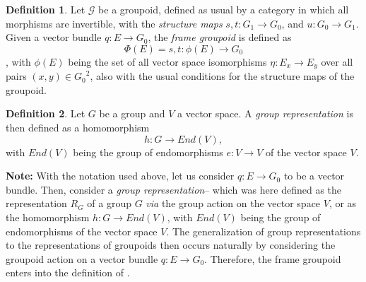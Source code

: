 \documentclass[12pt]{article}
\theoremstyle{plain}
\theoremstyle{definition}
\newtheorem{definition}{Definition}[section]
\numberwithin{equation}{section}
\newcommand{\grp}{\mathcal G}
\newcommand{\<}{{\langle}}
\begin{document}
\begin{definition}
Let $\grp$ be a groupoid, defined as usual by a category in which all morphisms are invertible, with the \emph{structure maps} $s,t: G_1 \longrightarrow  G_0$, and $u: G_0 \longrightarrow G_1$. Given a vector bundle $q : E \longrightarrow  G_0$, the \emph{frame groupoid} is defined as $$\Phi(E)=s,t: \phi(E) \longrightarrow  G_0$$,  with $\phi(E)$ being the set of all vector space isomorphisms $\eta: E_x \longrightarrow  E_y$ over all pairs $(x,y) \in {G_0}^2$, also with the usual conditions for the structure maps of the groupoid. 
\end{definition}



\begin{definition}
Let  $G$ be a group and $V$ a vector space. A \emph{group representation} is then defined as a homomorphism 
$$h: G  \longrightarrow  End(V),$$ with $End(V)$ being the group of endomorphisms $e: V \longrightarrow V $ of the vector space $V$.
\end{definition}



{\bf Note:}
With the notation used above, let us consider $q:E \longrightarrow  G_0$  to be a vector bundle. Then, consider a 
\emph{group representation}-- which was here defined as the representation $R_G$ of a group $G$ {\it via} the group action on the vector space $V$, or as the homomorphism $h: G  \longrightarrow  End(V)$, with $End(V)$ being the group of endomorphisms of the vector space $V$. The generalization of group representations to the representations of groupoids then occurs naturally by considering the groupoid action on a vector bundle $q: E \longrightarrow  G_0$. Therefore, the frame groupoid enters into the definition of .


\end{document}

